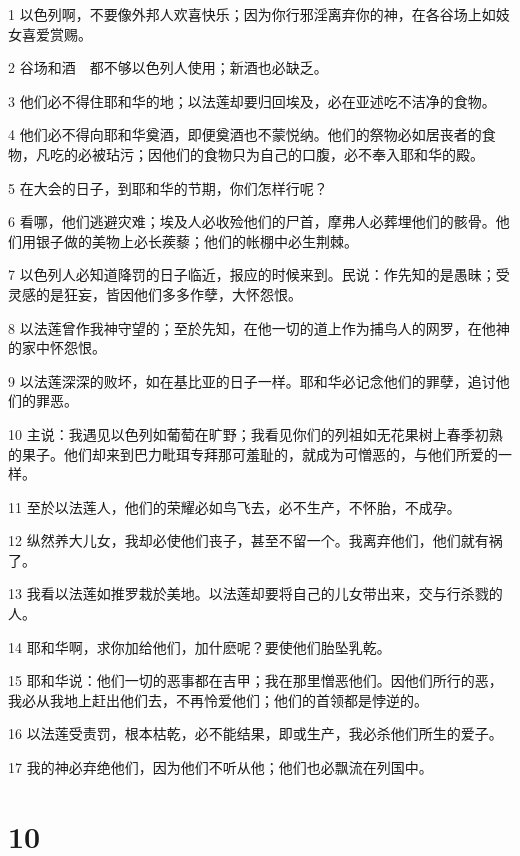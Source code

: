 \par 1 以色列啊，不要像外邦人欢喜快乐；因为你行邪淫离弃你的神，在各谷场上如妓女喜爱赏赐。
\par 2 谷场和酒　都不够以色列人使用；新酒也必缺乏。
\par 3 他们必不得住耶和华的地；以法莲却要归回埃及，必在亚述吃不洁净的食物。
\par 4 他们必不得向耶和华奠酒，即便奠酒也不蒙悦纳。他们的祭物必如居丧者的食物，凡吃的必被玷污；因他们的食物只为自己的口腹，必不奉入耶和华的殿。
\par 5 在大会的日子，到耶和华的节期，你们怎样行呢？
\par 6 看哪，他们逃避灾难；埃及人必收殓他们的尸首，摩弗人必葬埋他们的骸骨。他们用银子做的美物上必长蒺藜；他们的帐棚中必生荆棘。
\par 7 以色列人必知道降罚的日子临近，报应的时候来到。民说：作先知的是愚昧；受灵感的是狂妄，皆因他们多多作孽，大怀怨恨。
\par 8 以法莲曾作我神守望的；至於先知，在他一切的道上作为捕鸟人的网罗，在他神的家中怀怨恨。
\par 9 以法莲深深的败坏，如在基比亚的日子一样。耶和华必记念他们的罪孽，追讨他们的罪恶。
\par 10 主说：我遇见以色列如葡萄在旷野；我看见你们的列祖如无花果树上春季初熟的果子。他们却来到巴力毗珥专拜那可羞耻的，就成为可憎恶的，与他们所爱的一样。
\par 11 至於以法莲人，他们的荣耀必如鸟飞去，必不生产，不怀胎，不成孕。
\par 12 纵然养大儿女，我却必使他们丧子，甚至不留一个。我离弃他们，他们就有祸了。
\par 13 我看以法莲如推罗栽於美地。以法莲却要将自己的儿女带出来，交与行杀戮的人。
\par 14 耶和华啊，求你加给他们，加什麽呢？要使他们胎坠乳乾。
\par 15 耶和华说：他们一切的恶事都在吉甲；我在那里憎恶他们。因他们所行的恶，我必从我地上赶出他们去，不再怜爱他们；他们的首领都是悖逆的。
\par 16 以法莲受责罚，根本枯乾，必不能结果，即或生产，我必杀他们所生的爱子。
\par 17 我的神必弃绝他们，因为他们不听从他；他们也必飘流在列国中。

\chapter{10}


